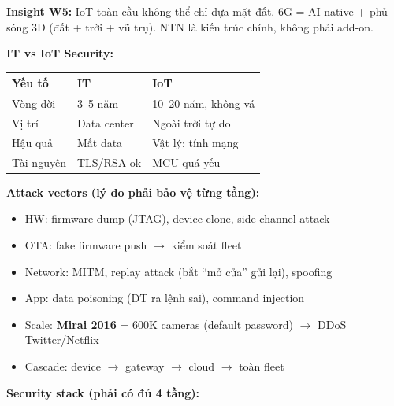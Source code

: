 \documentclass[9pt,a4paper,twocolumn]{article}
\begin{document}
\begin{tcolorbox}[insightbox]
\scriptsize \textbf{Insight W5:} IoT toàn cầu không thể chỉ dựa mặt đất.
6G = AI-native + phủ sóng 3D (đất + trời + vũ trụ). NTN là kiến trúc chính, không phải add-on.
\end{tcolorbox}

\begin{tcolorbox}[weekbox, title={W6 --- IoT Security (Toàn stack)}]

\textbf{IT vs IoT Security:}

\begin{tabular}{@{}p{1.6cm}p{1.8cm}p{2.0cm}@{}}
\toprule
\scriptsize Yếu tố & \scriptsize IT & \scriptsize IoT \\
\midrule
\scriptsize Vòng đời & \scriptsize 3--5 năm & \scriptsize 10--20 năm, không vá \\
\scriptsize Vị trí & \scriptsize Data center & \scriptsize Ngoài trời tự do \\
\scriptsize Hậu quả & \scriptsize Mất data & \scriptsize Vật lý: tính mạng \\
\scriptsize Tài nguyên & \scriptsize TLS/RSA ok & \scriptsize MCU quá yếu \\
\bottomrule
\end{tabular}

\vspace{3pt}
\textbf{Attack vectors (lý do phải bảo vệ từng tầng):}
\begin{itemize}
  \item HW: firmware dump (JTAG), device clone, side-channel attack
  \item OTA: fake firmware push $\rightarrow$ kiểm soát fleet
  \item Network: MITM, replay attack (bắt ``mở cửa'' gửi lại), spoofing
  \item App: data poisoning (DT ra lệnh sai), command injection
  \item Scale: \textbf{Mirai 2016} = 600K cameras (default password) $\rightarrow$ DDoS Twitter/Netflix
  \item Cascade: device $\rightarrow$ gateway $\rightarrow$ cloud $\rightarrow$ toàn fleet
\end{itemize}

\textbf{Security stack (phải có đủ 4 tầng):}


\end{tcolorbox}
\end{document}
